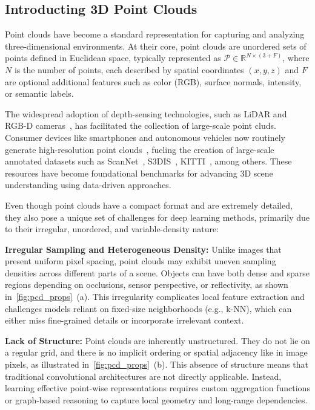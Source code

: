 \subsection{Introducting 3D Point Clouds}

Point clouds have become a standard representation for capturing and analyzing
three-dimensional environments. At their core, point clouds are unordered sets
of points defined in Euclidean space, typically represented as $\mathcal{P} \in
    \mathbb{R}^{N \times (3 + F)}$, where $N$ is the number of points, each
described by spatial coordinates $(x, y, z)$ and $F$ are optional additional
features such as color (RGB), surface normals, intensity, or semantic labels.

The widespread adoption of depth-sensing technologies, such as LiDAR and RGB-D
cameras~\cite{alexiadis2014fast,song2016robust}, has facilitated the collection
of large-scale point cluds.
%
Consumer devices like smartphones and autonomous vehicles now routinely
generate high-resolution point clouds~\cite{li2020lidar}, fueling the creation
of large-scale annotated datasets such as ScanNet~\cite{dai2017scannet},
S3DIS~\cite{armeni20163d}, KITTI~\cite{behley2019semantickitti}, among others.
These resources have become foundational benchmarks for advancing 3D scene
understanding using data-driven approaches.

Even though point clouds have a compact format and are extremely detailed, they
also pose a unique set of challenges for deep learning methods, primarily due
to their irregular, unordered, and variable-density nature:

\textbf{Irregular Sampling and Heterogeneous Density:} Unlike images that
present uniform pixel spacing, point clouds may exhibit uneven sampling densities across different
parts of a scene. Objects can have both dense and sparse regions depending on
occlusions, sensor perspective, or reflectivity, as shown in~\ref{fig:pcd_props}~(a).
This irregularity complicates local feature extraction and challenges models
reliant on fixed-size neighborhoods (e.g., k-NN), which can either miss fine-grained details or
incorporate irrelevant context.

\textbf{Lack of Structure:} Point clouds are inherently unstructured.
They do not lie on a regular grid, and there is no implicit ordering or spatial
adjacency like in image pixels, as illustrated in~\ref{fig:pcd_props}~(b).
This absence of structure means that traditional convolutional architectures
are not directly applicable.
Instead, learning effective point-wise representations requires custom
aggregation functions or graph-based reasoning to capture local geometry
and long-range dependencies.


